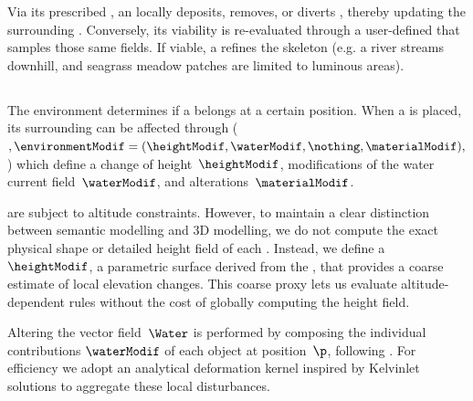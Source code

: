 Via its prescribed , an  locally deposits, removes, or diverts , thereby updating the surrounding . Conversely, its viability is re-evaluated through a user-defined  that samples those same fields. If viable, a  refines the skeleton (e.g. a river streams downhill, and seagrass meadow patches are limited to luminous areas).

\subsection{}

The environment determines if a  belongs at a certain position.
When a  is placed, its surrounding  can be affected through  ($,\environmentModif = (\heightModif, \waterModif, \nothing, \materialModif),$) which define a change of height~$\heightModif$, modifications of the water current field~$\waterModif$, and  alterations~$\materialModif$.

 are subject to altitude constraints.
However, to maintain a clear distinction between semantic modelling and 3D modelling, we do not compute the exact physical shape or detailed height field of each .
Instead, we define a ~$\heightModif$, a parametric surface derived from the , that provides a coarse estimate of local elevation changes. This coarse proxy lets us evaluate altitude-dependent rules without the cost of globally computing the height field.

Altering the vector field~$\Water$ is performed by composing the individual contributions $\waterModif$ of each object at position~$\p$, following \citep{Wejchert1991}. For efficiency we adopt an analytical deformation kernel inspired by Kelvinlet solutions \cite{DeGoes2017} to aggregate these local disturbances.


